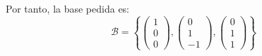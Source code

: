 \documentclass[12pt]{article}
\begin{document}
\begin{ejercicio}[4 puntos]
\begin{enumerate}
			Por tanto, la base pedida es:
			\[
				\mathcal{B} = \left\lbrace 
				\begin{pmatrix} 1 \\ 0 \\ 0 \end{pmatrix}, 
				\begin{pmatrix} 0 \\ 1 \\ -1 \end{pmatrix}, 
				\begin{pmatrix} 0 \\ 1 \\ 1 \end{pmatrix}
				\right\rbrace
			\]
		\end{enumerate}
		\end{ejercicio}
\end{document}
